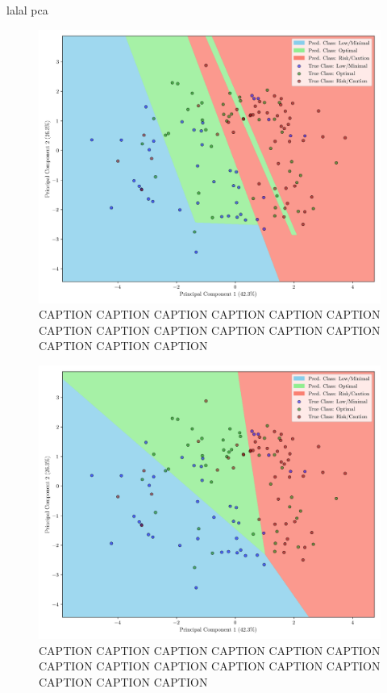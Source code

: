 \documentclass[conference]{IEEEtran}
\begin{document}
lalal pca

\begin{figure}[H]
    \centering
    \includegraphics[width=1\linewidth]{assets/pca_dtree.png}
    \caption{CAPTION CAPTION CAPTION CAPTION CAPTION CAPTION CAPTION CAPTION CAPTION CAPTION CAPTION CAPTION CAPTION CAPTION CAPTION}
    \label{pca_dtree}
\end{figure}

\begin{figure}[H]
    \centering
    \includegraphics[width=1\linewidth]{assets/pca_reglog.png}
    \caption{CAPTION CAPTION CAPTION CAPTION CAPTION CAPTION CAPTION CAPTION CAPTION CAPTION CAPTION CAPTION CAPTION CAPTION CAPTION}
    \label{pca_reglog}
\end{figure}
\end{document}
